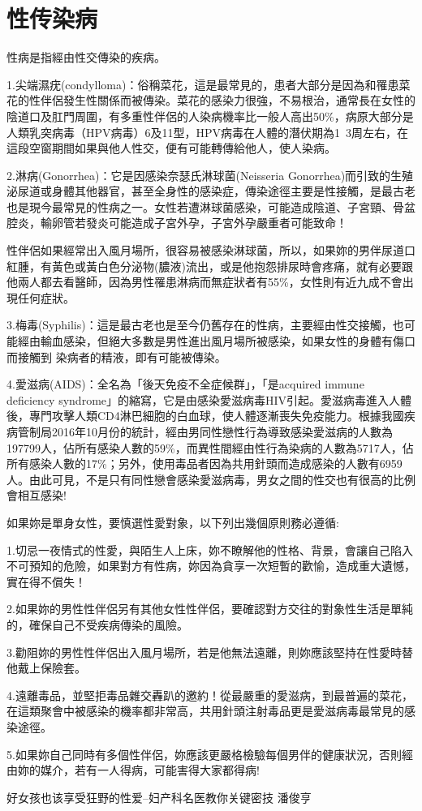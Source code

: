 \documentclass[12pt,UTF8]{ctexbook}
\begin{document}
\part{性传染病}

性病是指經由性交傳染的疾病。

1.尖端濕疣(condylloma)：俗稱菜花，這是最常見的，患者大部分是因為和罹患菜花的性伴侶發生性關係而被傳染。菜花的感染力很強，不易根治，通常長在女性的陰道口及肛門周圍，有多重性伴侶的人染病機率比一般人高出50\%，病原大部分是人類乳突病毒（HPV病毒）6及11型，HPV病毒在人體的潛伏期為1~3周左右，在這段空窗期間如果與他人性交，便有可能轉傳給他人，使人染病。

2.淋病(Gonorrhea)：它是因感染奈瑟氏淋球菌(Neisseria Gonorrhea)而引致的生殖泌尿道或身體其他器官，甚至全身性的感染症，傳染途徑主要是性接觸，是最古老也是現今最常見的性病之一。女性若遭淋球菌感染，可能造成陰道、子宮頸、骨盆腔炎，輸卵管若發炎可能造成子宮外孕，子宮外孕嚴重者可能致命！

性伴侶如果經常出入風月場所，很容易被感染淋球菌，所以，如果妳的男伴尿道口紅腫，有黃色或黃白色分泌物(膿液)流出，或是他抱怨排尿時會疼痛，就有必要跟他兩人都去看醫師，因為男性罹患淋病而無症狀者有55\%，女性則有近九成不會出現任何症狀。

3.梅毒(Syphilis)：這是最古老也是至今仍舊存在的性病，主要經由性交接觸，也可能經由輸血感染，但絕大多數是男性進出風月場所被感染，如果女性的身體有傷口而接觸到
染病者的精液，即有可能被傳染。

4.愛滋病(AIDS)：全名為「後天免疫不全症候群」，「是acquired immune deficiency syndrome」的縮寫，它是由感染愛滋病毒HIV引起。愛滋病毒進入人體後，專門攻擊人類CD4淋巴細胞的白血球，使人體逐漸喪失免疫能力。根據我國疾病管制局2016年10月份的統計，經由男同性戀性行為導致感染愛滋病的人數為197799人，佔所有感染人數的59\%，而異性間經由性行為染病的人數為5717人，佔所有感染人數的17\%；另外，使用毒品者因為共用針頭而造成感染的人數有6959人。由此可見，不是只有同性戀會感染愛滋病毒，男女之間的性交也有很高的比例會相互感染!

如果妳是單身女性，要慎選性愛對象，以下列出幾個原則務必遵循:

1.切忌一夜情式的性愛，與陌生人上床，妳不瞭解他的性格、背景，會讓自己陷入不可預知的危險，如果對方有性病，妳因為貪享一次短暫的歡愉，造成重大遺憾，實在得不償失！

2.如果妳的男性性伴侶另有其他女性性伴侶，要確認對方交往的對象性生活是單純的，確保自己不受疾病傳染的風險。

3.勸阻妳的男性性伴侶出入風月場所，若是他無法遠離，則妳應該堅持在性愛時替他戴上保險套。

4.遠離毒品，並堅拒毒品雜交轟趴的邀約！從最嚴重的愛滋病，到最普遍的菜花，在這類聚會中被感染的機率都非常高，共用針頭注射毒品更是愛滋病毒最常見的感染途徑。

5.如果妳自己同時有多個性伴侶，妳應該更嚴格檢驗每個男伴的健康狀況，否則經由妳的媒介，若有一人得病，可能害得大家都得病!

\backmatter

好女孩也该享受狂野的性爱--妇产科名医教你关键密技  潘俊亨
\end{document}
